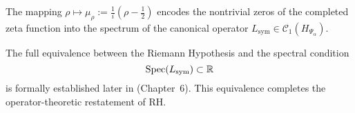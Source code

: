 \begin{remark}
\label{rem:rh_equivalence_forward_ref}
The mapping \( \rho \mapsto \mu_\rho := \frac{1}{i}(\rho - \tfrac{1}{2}) \) encodes the nontrivial zeros of the completed zeta function into the spectrum of the canonical operator \( L_{\mathrm{sym}} \in \mathcal{C}_1(H_{\Psi_\alpha}) \). 

The full equivalence between the Riemann Hypothesis and the spectral condition
\[
\operatorname{Spec}(L_{\mathrm{sym}}) \subset \mathbb{R}
\]
is formally established later in  (Chapter~6). This equivalence completes the operator-theoretic restatement of RH.
\end{remark}
